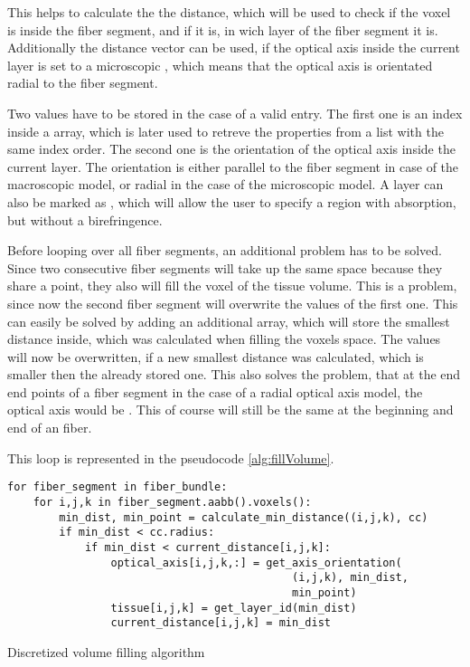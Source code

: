 This helps to calculate the the distance, which will be used to check if the voxel is inside the fiber segment, and if it is, in wich layer of the fiber segment it is.
Additionally the distance vector can be used, if the optical axis inside the current layer is set to a microscopic \dummy{}, which means that the optical axis is orientated radial to the fiber segment.
\par
% 
Two values have to be stored in the case of a valid entry.
The first one is an index inside a  array, which is later used to retreve the properties from a list with the same index order.
The second one is the orientation of the optical axis inside the current layer.
The orientation is either parallel to the fiber segment in case of the macroscopic model, or radial in the case of the microscopic model.
A layer can also be marked as , which will allow the user to specify a region with absorption, but without a birefringence.
\par
% 
Before looping over all fiber segments, an additional problem has to be solved.
Since two consecutive fiber segments will take up the same space because they share a point, they also will fill the voxel of the tissue volume.
This is a problem, since now the second fiber segment will overwrite the values of the first one.
This can easily be solved by adding an additional array, which will store the smallest distance inside, which was calculated when filling the voxels space.
The values will now be overwritten, if a new smallest distance was calculated, which is smaller then the already stored one.
This also solves the problem, that at the end end points of a fiber segment in the case of a radial optical axis model, the optical axis would be .
This of course will still be the same at the beginning and end of an fiber.
\par
% 
This  loop is represented in the pseudocode \cref{alg:fillVolume}.
% 
\begin{lstfloat}[!tb]
\lstset{style=python}
\begin{lstlisting}[]
for fiber_segment in fiber_bundle:
    for i,j,k in fiber_segment.aabb().voxels():
        min_dist, min_point = calculate_min_distance((i,j,k), cc)
        if min_dist < cc.radius:
            if min_dist < current_distance[i,j,k]:
                optical_axis[i,j,k,:] = get_axis_orientation(
                                            (i,j,k), min_dist,
                                            min_point)
                tissue[i,j,k] = get_layer_id(min_dist)
                current_distance[i,j,k] = min_dist
\end{lstlisting}
\caption{Discretized volume filling algorithm}
\label{alg:fillVolume}
\end{lstfloat}
%
% 
% 
% 
